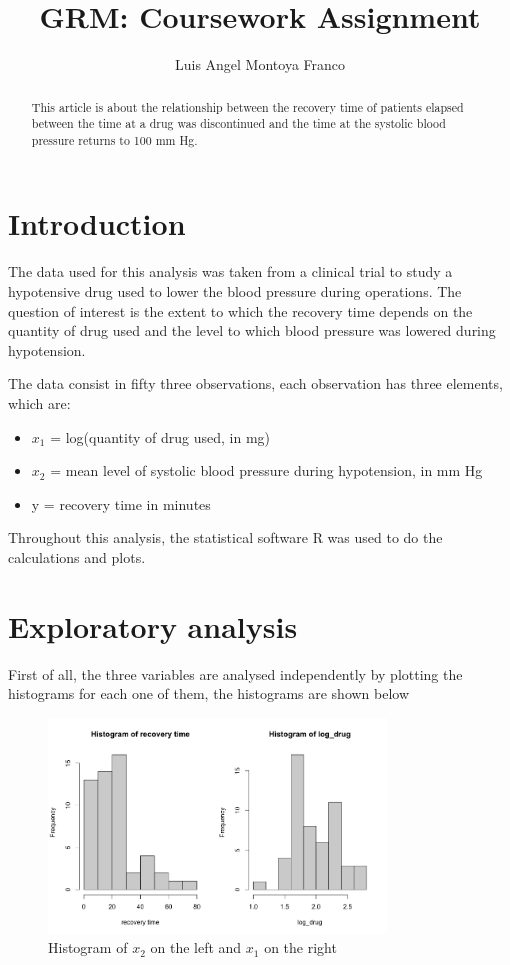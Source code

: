 \documentclass{article}
\title{\LARGE GRM: Coursework Assignment}
\author{Luis Angel Montoya Franco}
\begin{document}
\maketitle

\begin{abstract}
This article is about the relationship between the recovery time of patients elapsed between the time at a drug was discontinued and the time at the systolic blood pressure returns to 100 mm Hg.
\end{abstract}

\section{Introduction}

The data used for this analysis was taken from a clinical trial to study a hypotensive drug used to lower the blood pressure during operations. The question of interest is the extent to which the recovery time depends on the quantity of drug used and the level to which blood pressure was lowered during hypotension. 

The data consist in fifty three observations, each observation has three elements, which are:
\begin{itemize}
    \item \(x_1\) = log(quantity of drug used, in mg)
    \item \(x_2\) =  mean level of systolic blood pressure during hypotension, in mm Hg
    \item y = recovery time in minutes
\end{itemize}
Throughout  this analysis, the statistical software R was used to do the calculations and plots. 
\section{Exploratory analysis}

First of all, the three variables are analysed independently by plotting the histograms for each one of them, the histograms are shown below


\begin{figure}[H]
\centering
\includegraphics[width=0.8\textwidth]{hx1x2.png}
\caption{\label{fig:frog} Histogram of $x_2$ on the left and $x_1$ on the right}
\end{figure}
\end{document}
